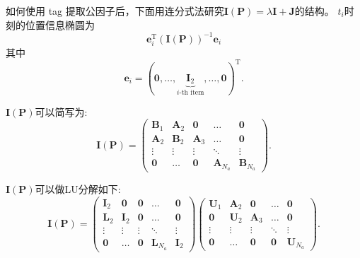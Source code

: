 \documentclass[notheorems,xetex]{beamer}
\theoremstyle{definition}
\begin{document}
\begin{frame}[noframenumbering]{如何使用 tag}
提取公因子后，下面用连分式法研究$\bm{I}(\bm{P})=\lambda \bm{I}+\bm{J}$的结构。
\pause
$t_{i}$时刻的位置信息椭圆为
\[
\bm{e}_{i}^{\textrm{T}}(\bm{I}(\bm{P}))^{-1}\bm{e}_{i}
\]
其中
\begin{equation*}
\bm{e}_i=(\bm{0},\dots,\underbrace{\bm{I}_2}_{i\text{-th item}},\dots,\bm{0})^{\textrm{T}}.
\end{equation*}
\end{frame}
\begin{frame}[noframenumbering]
$\bm{I}(\bm{P})$可以简写为:
\begin{equation*}
\bm{I}(\bm{P})=\begin{pmatrix}
                 \bm{B}_1 & \bm{A}_2 & \bm{0} & \dots & \bm{0} \\
                 \bm{A}_2 & \bm{B}_2 & \bm{A}_3 & \dots & \bm{0} \\
                 \vdots & \vdots & \vdots & \ddots & \vdots \\
                 \bm{0} & \dots & \bm{0} & \bm{A}_{N_a} & \bm{B}_{N_a}
               \end{pmatrix}.
\end{equation*}

$\bm{I}(\bm{P})$可以做LU分解如下:
\pause
\begin{equation*}\label{eq:LU}
  \bm{I}(\bm{P})=\begin{pmatrix}
                 \bm{I}_2 & \bm{0} & \bm{0} & \dots & \bm{0} \\
                 \bm{L}_2 & \bm{I}_2 & \bm{0} & \dots & \bm{0} \\
                 \vdots & \vdots & \vdots & \ddots & \vdots \\
                 \bm{0} & \dots & \bm{0} & \bm{L}_{N_a} & \bm{I}_{2}
               \end{pmatrix}\begin{pmatrix}
                 \bm{U}_1 & \bm{A}_2 & \bm{0} & \dots & \bm{0} \\
                 \bm{0} & \bm{U}_2 & \bm{A}_3 & \dots & \bm{0} \\
                 \vdots & \vdots & \vdots & \ddots & \vdots \\
                 \bm{0} & \dots & \bm{0} & \bm{0} & \bm{U}_{N_a}
               \end{pmatrix}.
\end{equation*}
\end{frame}
\end{document}
